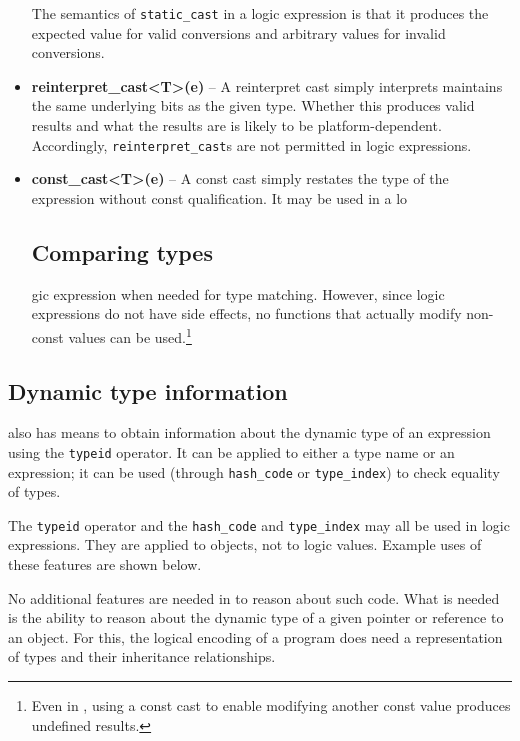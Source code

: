 \begin{itemize}
	The semantics of \lstinline|static_cast| in a logic expression is that it produces the expected value for valid conversions and arbitrary values for invalid conversions.
	
	\item \textbf{reinterpret\_cast<T>(e)} -- A reinterpret cast simply interprets maintains the same underlying bits as the given type. 
	Whether this produces valid results and what the results are is likely to be platform-dependent. 
	Accordingly, \lstinline|reinterpret_cast|s are not permitted in logic expressions.
	
	\item \textbf{const\_cast<T>(e)} -- A const cast simply restates the type of the expression without const qualification. 
	It may be used in a lo\subsection{Comparing types}
	gic expression when needed for type matching. 
	However, since logic expressions do not have side effects, no functions that actually modify non-const values can be used.\footnote{Even in \lang{}, using a const cast to enable modifying another const value produces undefined results.}
	
	

\end{itemize}
\subsection{Dynamic type information}

\lang{} also has means to obtain information about the dynamic
type of an expression using the \lstinline|typeid| operator. It can be applied to either a type name or an expression; it can be used (through \lstinline|hash_code| or \lstinline|type_index|) to check equality of types.

The  \lstinline|typeid| operator and the \lstinline|hash_code| and \lstinline|type_index| may all be used in logic expressions. They are
applied to \lang{} objects, not to logic values. Example uses of these features are
shown below.



No additional features are needed in \NAME{} to reason about such code. What is needed
is the ability to reason about the dynamic type of a given pointer or reference to
an object. 
For this, the logical encoding of a \lang{} program does need a representation of \lang{} types and their inheritance relationships.

